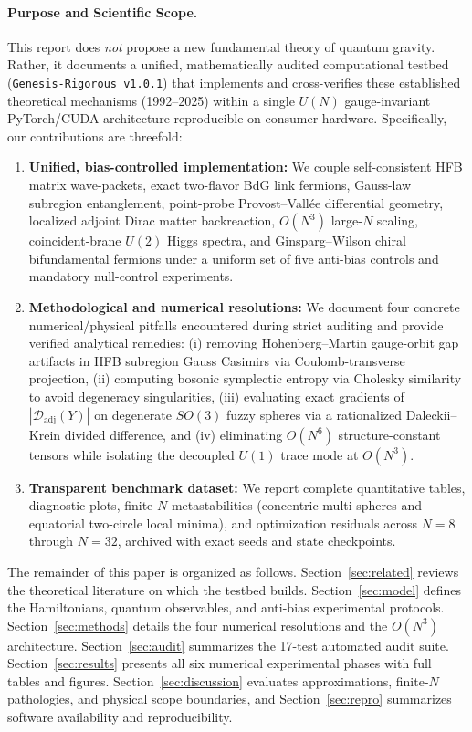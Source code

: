 \documentclass[11pt,a4paper]{article}
\begin{document}
\paragraph{Purpose and Scientific Scope.}
This report does \emph{not} propose a new fundamental theory of quantum gravity. Rather, it documents a unified, mathematically audited computational testbed (\texttt{Genesis-Rigorous v1.0.1}) that implements and cross-verifies these established theoretical mechanisms (1992--2025) within a single $U(N)$ gauge-invariant PyTorch/CUDA architecture reproducible on consumer hardware. Specifically, our contributions are threefold:
\begin{enumerate}
  \item \textbf{Unified, bias-controlled implementation:} We couple self-consistent HFB matrix wave-packets, exact two-flavor BdG link fermions, Gauss-law subregion entanglement, point-probe Provost--Vall\'ee differential geometry, localized adjoint Dirac matter backreaction, $O(N^3)$ large-$N$ scaling, coincident-brane $U(2)$ Higgs spectra, and Ginsparg--Wilson chiral bifundamental fermions under a uniform set of five anti-bias controls and mandatory null-control experiments.
  \item \textbf{Methodological and numerical resolutions:} We document four concrete numerical/physical pitfalls encountered during strict auditing and provide verified analytical remedies: (i) removing Hohenberg--Martin gauge-orbit gap artifacts in HFB subregion Gauss Casimirs via Coulomb-transverse projection, (ii) computing bosonic symplectic entropy via Cholesky similarity to avoid degeneracy singularities, (iii) evaluating exact gradients of $|\mathcal{D}_{\mathrm{adj}}(Y)|$ on degenerate $SO(3)$ fuzzy spheres via a rationalized Daleckii--Krein divided difference, and (iv) eliminating $O(N^6)$ structure-constant tensors while isolating the decoupled $U(1)$ trace mode at $O(N^3)$.
  \item \textbf{Transparent benchmark dataset:} We report complete quantitative tables, diagnostic plots, finite-$N$ metastabilities (concentric multi-spheres and equatorial two-circle local minima), and optimization residuals across $N=8$ through $N=32$, archived with exact seeds and state checkpoints.
\end{enumerate}

The remainder of this paper is organized as follows. Section~\ref{sec:related} reviews the theoretical literature on which the testbed builds. Section~\ref{sec:model} defines the Hamiltonians, quantum observables, and anti-bias experimental protocols. Section~\ref{sec:methods} details the four numerical resolutions and the $O(N^3)$ architecture. Section~\ref{sec:audit} summarizes the 17-test automated audit suite. Section~\ref{sec:results} presents all six numerical experimental phases with full tables and figures. Section~\ref{sec:discussion} evaluates approximations, finite-$N$ pathologies, and physical scope boundaries, and Section~\ref{sec:repro} summarizes software availability and reproducibility.
\end{document}
